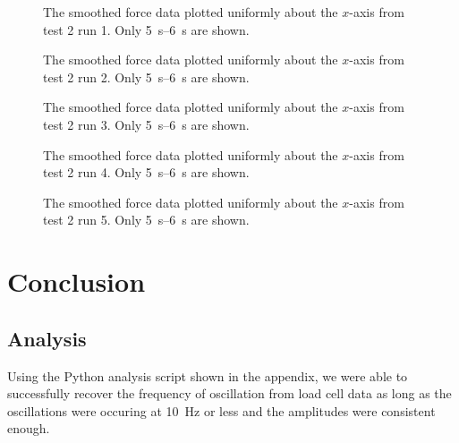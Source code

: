 \documentclass[12 pt]{report}
\begin{document}
\begin{figure}[htbp]
	\centering
	
	\caption{The smoothed force data plotted uniformly about the $x$-axis from test \num{2} run \num{1}. Only \qtyrange{5}{6}{\second} are shown.}
	\label{fig:test2_run1_results}
\end{figure}

\begin{figure}[htbp]
	\centering
	
	\caption{The smoothed force data plotted uniformly about the $x$-axis from test \num{2} run \num{2}. Only \qtyrange{5}{6}{\second} are shown.}
	\label{fig:test2_run2_results}
\end{figure}

\begin{figure}[htbp]
	\centering
	
	\caption{The smoothed force data plotted uniformly about the $x$-axis from test \num{2} run \num{3}. Only \qtyrange{5}{6}{\second} are shown.}
	\label{fig:test2_run3_results}
\end{figure}

\begin{figure}[htbp]
	\centering
	
	\caption{The smoothed force data plotted uniformly about the $x$-axis from test \num{2} run \num{4}. Only \qtyrange{5}{6}{\second} are shown.}
	\label{fig:test2_run4_results}
\end{figure}

\begin{figure}[htbp]
	\centering
	
	\caption{The smoothed force data plotted uniformly about the $x$-axis from test \num{2} run \num{5}. Only \qtyrange{5}{6}{\second} are shown.}
	\label{fig:test2_run5_results}
\end{figure}

\chapter{Conclusion} \label{conclusion-chapter}
\section{Analysis} \label{analysis}
Using the Python analysis script shown in the appendix, we were able to successfully recover the frequency of oscillation from load cell data as long as the oscillations were occuring at \qty{10}{\hertz} or less and the amplitudes were consistent enough.
\end{document}
